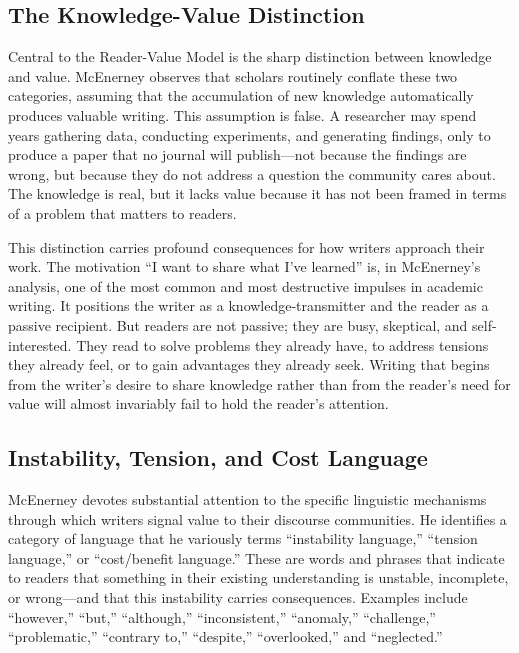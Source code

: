 \documentclass[12pt]{article}
\begin{document}
\subsection*{The Knowledge-Value Distinction}

Central to the Reader-Value Model is the sharp distinction between knowledge and value. McEnerney observes that scholars routinely conflate these two categories, assuming that the accumulation of new knowledge automatically produces valuable writing. This assumption is false. A researcher may spend years gathering data, conducting experiments, and generating findings, only to produce a paper that no journal will publish---not because the findings are wrong, but because they do not address a question the community cares about. The knowledge is real, but it lacks value because it has not been framed in terms of a problem that matters to readers.

This distinction carries profound consequences for how writers approach their work. The motivation ``I want to share what I've learned'' is, in McEnerney's analysis, one of the most common and most destructive impulses in academic writing. It positions the writer as a knowledge-transmitter and the reader as a passive recipient. But readers are not passive; they are busy, skeptical, and self-interested. They read to solve problems they already have, to address tensions they already feel, or to gain advantages they already seek. Writing that begins from the writer's desire to share knowledge rather than from the reader's need for value will almost invariably fail to hold the reader's attention.

\subsection*{Instability, Tension, and Cost Language}

McEnerney devotes substantial attention to the specific linguistic mechanisms through which writers signal value to their discourse communities. He identifies a category of language that he variously terms ``instability language,'' ``tension language,'' or ``cost/benefit language.'' These are words and phrases that indicate to readers that something in their existing understanding is unstable, incomplete, or wrong---and that this instability carries consequences. Examples include ``however,'' ``but,'' ``although,'' ``inconsistent,'' ``anomaly,'' ``challenge,'' ``problematic,'' ``contrary to,'' ``despite,'' ``overlooked,'' and ``neglected.''
\end{document}
